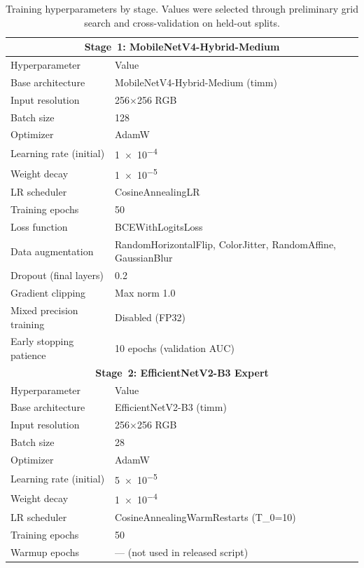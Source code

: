 \begin{table}[h]
  \centering
  \caption{Training hyperparameters by stage. Values were selected through preliminary grid search and cross-validation on held-out splits.}
  \label{tab:hyperparams_appendix}
  {\small
  \begin{tabular}{@{}ll@{}}
    \toprule
    \multicolumn{2}{c}{\textbf{Stage~1: MobileNetV4-Hybrid-Medium}} \\
    \midrule
    Hyperparameter & Value \\
    \midrule
    Base architecture & MobileNetV4-Hybrid-Medium (timm) \\
    Input resolution & 256$\times$256 RGB \\
    Batch size & 128 \\
    Optimizer & AdamW \\
    Learning rate (initial) & \num{1e-4} \\
    Weight decay & \num{1e-5} \\
    LR scheduler & CosineAnnealingLR \\
    Training epochs & 50 \\
    Loss function & BCEWithLogitsLoss \\
    Data augmentation & RandomHorizontalFlip, ColorJitter, RandomAffine, GaussianBlur \\
    Dropout (final layers) & 0.2 \\
    Gradient clipping & Max norm 1.0 \\
    Mixed precision training & Disabled (FP32) \\
    Early stopping patience & 10 epochs (validation AUC) \\
    \midrule
    \multicolumn{2}{c}{\textbf{Stage~2: EfficientNetV2-B3 Expert}} \\
    \midrule
    Hyperparameter & Value \\
    \midrule
    Base architecture & EfficientNetV2-B3 (timm) \\
    Input resolution & 256$\times$256 RGB \\
    Batch size & 28 \\
    Optimizer & AdamW \\
    Learning rate (initial) & \num{5e-5} \\
    Weight decay & \num{1e-4} \\
    LR scheduler & CosineAnnealingWarmRestarts (T\_0=10) \\
    Training epochs & 50 \\
    Warmup epochs & --- (not used in released script) \\

\end{tabular}}
\end{table}
